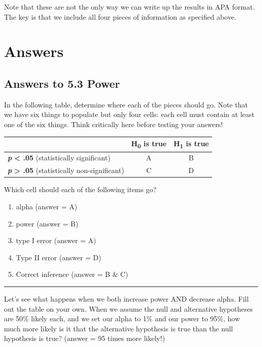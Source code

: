 \documentclass[
]{book}
\providecommand{\tightlist}{%
  \setlength{\itemsep}{0pt}\setlength{\parskip}{0pt}}
\begin{document}
Note that these are not the only way we can write up the results in APA format. The key is that we include all four pieces of information as specified above.

\hypertarget{appendix-appendices}{%
\appendix}


\hypertarget{answers}{%
\chapter{Answers}\label{answers}}

\hypertarget{answers-to-5.3-power}{%
\section{Answers to 5.3 Power}\label{answers-to-5.3-power}}

In the following table, determine where each of the pieces should go. Note that we have six things to populate but only four cells: each cell must contain at least one of the six things. Think critically here before testing your answers!

\begin{longtable}[]{@{}lcc@{}}
\toprule
& H\textsubscript{0} is true & H\textsubscript{1} is true \\
\midrule
\endhead
\textbf{\emph{p}} \textbf{\textless{} .05} (statistically significant) & A & B \\
\textbf{\emph{p}} \textbf{\textgreater{} .05} (statistically non-significant) & C & D \\
\bottomrule
\end{longtable}

Which cell should each of the following items go?

\begin{enumerate}
\def\labelenumi{\arabic{enumi}.}
\tightlist
\item
  alpha (answer = A)
\item
  power (answer = B)
\item
  type I error (answer = A)
\item
  Type II error (answer = D)
\item
  Correct inference (answer = B \& C)
\end{enumerate}

\begin{center}\rule{0.5\linewidth}{0.5pt}\end{center}

Let's see what happens when we both increase power AND decrease alpha. Fill out the table on your own. When we assume the null and alternative hypotheses are 50\% likely each, and we set our alpha to 1\% and our power to 95\%, how much more likely is it that the alternative hypothesis is true than the null hypothesis is true? (answer = 95 times more likely!)
\end{document}
